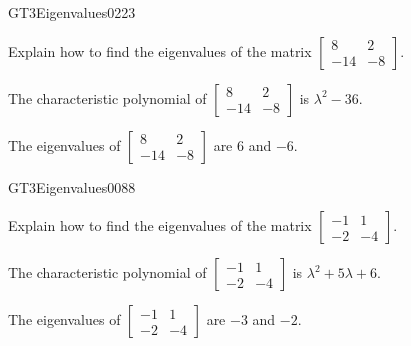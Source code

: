 \newpage




\begin{exercise}{GT3}{Eigenvalues}{0223} 
\begin{exerciseStatement} 

Explain how to find the eigenvalues of the matrix \(\left[\begin{array}{cc}
8 & 2 \\
-14 & -8
\end{array}\right]\).

 \end{exerciseStatement}
 \begin{exerciseAnswer} 

The characteristic polynomial of \(\left[\begin{array}{cc}
8 & 2 \\
-14 & -8
\end{array}\right]\) is \(\lambda^{2} - 36\).

 

The eigenvalues of \(\left[\begin{array}{cc}
8 & 2 \\
-14 & -8
\end{array}\right]\) are \(6\) and \(-6\).

 \end{exerciseAnswer}
 \end{exercise}



\begin{exercise}{GT3}{Eigenvalues}{0088} 
\begin{exerciseStatement} 

Explain how to find the eigenvalues of the matrix \(\left[\begin{array}{cc}
-1 & 1 \\
-2 & -4
\end{array}\right]\).

 \end{exerciseStatement}
 \begin{exerciseAnswer} 

The characteristic polynomial of \(\left[\begin{array}{cc}
-1 & 1 \\
-2 & -4
\end{array}\right]\) is \(\lambda^{2} + 5 \lambda + 6\).

 

The eigenvalues of \(\left[\begin{array}{cc}
-1 & 1 \\
-2 & -4
\end{array}\right]\) are \(-3\) and \(-2\).

 \end{exerciseAnswer}
 \end{exercise}


